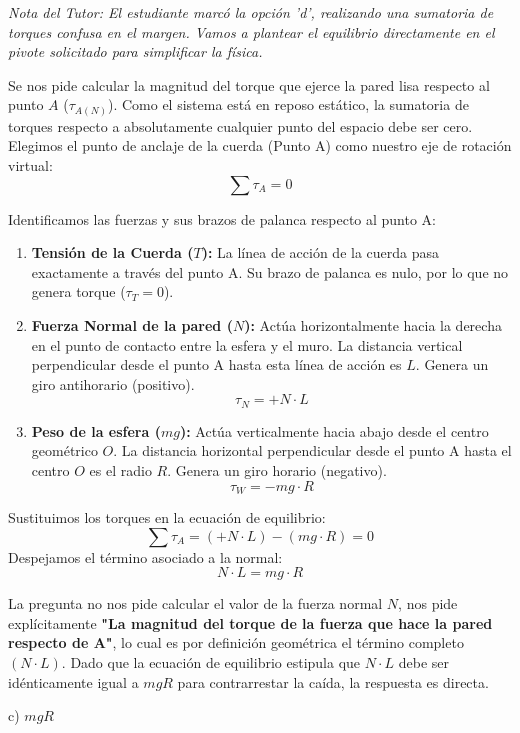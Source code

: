 \documentclass[12pt, a4paper]{article}
\begin{document}
\textit{Nota del Tutor: El estudiante marcó la opción 'd', realizando una sumatoria de torques confusa en el margen. Vamos a plantear el equilibrio directamente en el pivote solicitado para simplificar la física.}

Se nos pide calcular la magnitud del torque que ejerce la pared lisa respecto al punto $A$ ($\tau_{A(N)}$). 
Como el sistema está en reposo estático, la sumatoria de torques respecto a absolutamente cualquier punto del espacio debe ser cero. Elegimos el punto de anclaje de la cuerda (Punto A) como nuestro eje de rotación virtual:
$$ \sum \tau_A = 0 $$

Identificamos las fuerzas y sus brazos de palanca respecto al punto A:
\begin{enumerate}
    \item \textbf{Tensión de la Cuerda ($T$):} La línea de acción de la cuerda pasa exactamente a través del punto A. Su brazo de palanca es nulo, por lo que no genera torque ($\tau_T = 0$).
    \item \textbf{Fuerza Normal de la pared ($N$):} Actúa horizontalmente hacia la derecha en el punto de contacto entre la esfera y el muro. La distancia vertical perpendicular desde el punto A hasta esta línea de acción es $L$. Genera un giro antihorario (positivo).
    $$ \tau_N = +N \cdot L $$
    \item \textbf{Peso de la esfera ($mg$):} Actúa verticalmente hacia abajo desde el centro geométrico $O$. La distancia horizontal perpendicular desde el punto A hasta el centro $O$ es el radio $R$. Genera un giro horario (negativo).
    $$ \tau_W = -mg \cdot R $$
\end{enumerate}

Sustituimos los torques en la ecuación de equilibrio:
$$ \sum \tau_A = (+N \cdot L) - (mg \cdot R) = 0 $$
Despejamos el término asociado a la normal:
$$ N \cdot L = mg \cdot R $$

La pregunta no nos pide calcular el valor de la fuerza normal $N$, nos pide explícitamente \textbf{"La magnitud del torque de la fuerza que hace la pared respecto de A"}, lo cual es por definición geométrica el término completo $(N \cdot L)$.
Dado que la ecuación de equilibrio estipula que $N \cdot L$ debe ser idénticamente igual a $mgR$ para contrarrestar la caída, la respuesta es directa.

\begin{tcolorbox}[colback=green!5!white, colframe=green!50!black, title=Respuesta Final]
\centering \Large c) $mgR$
\end{tcolorbox}
\end{document}
